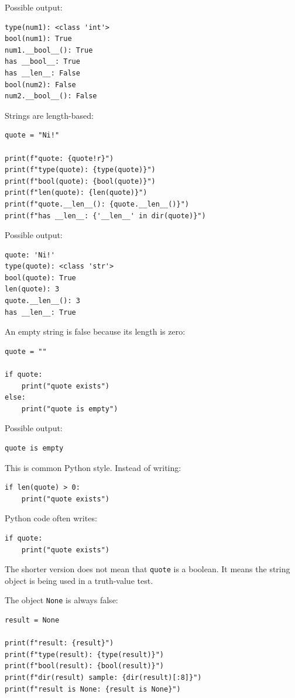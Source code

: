 Possible output:

\begin{verbatim}
type(num1): <class 'int'>
bool(num1): True
num1.__bool__(): True
has __bool__: True
has __len__: False
bool(num2): False
num2.__bool__(): False
\end{verbatim}

Strings are length-based:

\begin{verbatim}
quote = "Ni!"

print(f"quote: {quote!r}")
print(f"type(quote): {type(quote)}")
print(f"bool(quote): {bool(quote)}")
print(f"len(quote): {len(quote)}")
print(f"quote.__len__(): {quote.__len__()}")
print(f"has __len__: {'__len__' in dir(quote)}")
\end{verbatim}

Possible output:

\begin{verbatim}
quote: 'Ni!'
type(quote): <class 'str'>
bool(quote): True
len(quote): 3
quote.__len__(): 3
has __len__: True
\end{verbatim}

An empty string is false because its length is zero:

\begin{verbatim}
quote = ""

if quote:
    print("quote exists")
else:
    print("quote is empty")
\end{verbatim}

Possible output:

\begin{verbatim}
quote is empty
\end{verbatim}

This is common Python style. Instead of writing:

\begin{verbatim}
if len(quote) > 0:
    print("quote exists")
\end{verbatim}

Python code often writes:

\begin{verbatim}
if quote:
    print("quote exists")
\end{verbatim}

The shorter version does not mean that \texttt{quote} is a boolean. It means the string object is being used in a truth-value test.

The object \texttt{None} is always false:

\begin{verbatim}
result = None

print(f"result: {result}")
print(f"type(result): {type(result)}")
print(f"bool(result): {bool(result)}")
print(f"dir(result) sample: {dir(result)[:8]}")
print(f"result is None: {result is None}")
\end{verbatim}

